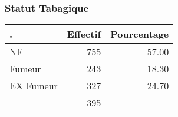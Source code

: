 \documentclass[11pt,a4paper]{article}\usepackage[]{graphicx}\usepackage[]{color}
\begin{document}
    \subsubsection{Statut Tabagique}

\begin{table}[ht]
\centering
\begin{tabular}{lrr}
  \hline
. & Effectif & Pourcentage \\ 
  \hline
NF & 755 & 57.00 \\ 
  Fumeur & 243 & 18.30 \\ 
  EX Fumeur & 327 & 24.70 \\ 
   & 395 &  \\ 
   \hline
\end{tabular}
\end{table}
\end{document}
